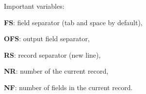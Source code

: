 Important variables:
\begin{enumx}
\item \textbf{FS}: field separator (tab and space by default),
\item \textbf{OFS}: output field separator,
\item \textbf{RS}: record separator (new line),
\item \textbf{NR}: number of the current record,
\item \textbf{NF}: number of fields in the current record. 
\end{enumx}
